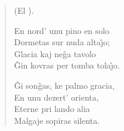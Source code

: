 \begin{verse}
\begin{center}
\footnotesize (El ).
\end{center}
                     En nord' unu pino en solo\\
                     Dormetas sur nuda alta\^{\j}o;\\
                     Glacia kaj ne\^ga tavolo\\
                     \^Gin kovras per tomba tola\^{\j}o.

                     \^Gi son\^gas, ke palmo gracia,\\
                     En unu dezert' orienta,\\
                     Eterne pri lando alia\\
                     Malgaje sopiras silenta.

\end{verse}


\smallrule{}
